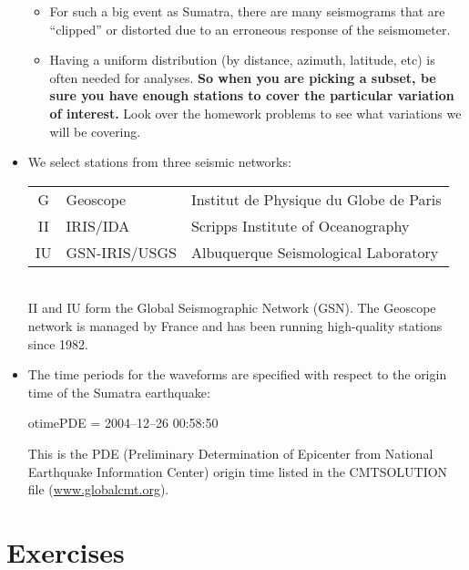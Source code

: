\documentclass[11pt,titlepage,fleqn]{article}
\begin{document}
\begin{itemize}
\begin{itemize}
\item For such a big event as Sumatra, there are many seismograms that are ``clipped'' or distorted due to an erroneous response of the seismometer.

\item Having a uniform distribution (by distance, azimuth, latitude, etc) is often needed for analyses. {\bf So when you are picking a subset, be sure you have enough stations to cover the particular variation of interest.} Look over the homework problems to see what variations we will be covering.
\end{itemize}

\item We select stations from three seismic networks: \\

\begin{tabular}{cll}
\hline
G   & Geoscope      & Institut de Physique du Globe de Paris \\
II  & IRIS/IDA      & Scripps Institute of Oceanography \\
IU  & GSN-IRIS/USGS & Albuquerque Seismological Laboratory \\
\hline
\end{tabular} \\

\noindent
II and IU form the Global Seismographic Network (GSN).
The Geoscope network is managed by France and has been running high-quality stations since 1982.

\item The time periods for the waveforms are specified with respect to the origin time of the Sumatra earthquake:

\vspace{0.5cm}
otimePDE = 2004--12--26 00:58:50
\vspace{0.5cm}

\noindent
This is the PDE (Preliminary Determination of Epicenter from National Earthquake Information Center) origin time listed in the CMTSOLUTION file (\url{www.globalcmt.org}).

\end{itemize}


\section{Exercises}
\end{document}
